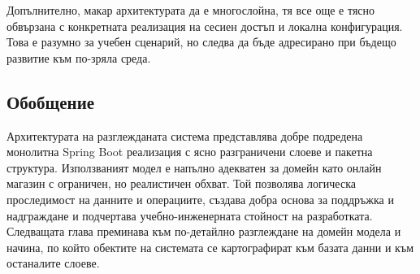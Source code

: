 Допълнително, макар архитектурата да е многослойна, тя все още е тясно обвързана с конкретната реализация на сесиен достъп и локална конфигурация. Това е разумно за учебен сценарий, но следва да бъде адресирано при бъдещо развитие към по-зряла среда.

\subsection{Обобщение}

Архитектурата на разглежданата система представлява добре подредена монолитна Spring Boot реализация с ясно разграничени слоеве и пакетна структура. Използваният модел е напълно адекватен за домейн като онлайн магазин с ограничен, но реалистичен обхват. Той позволява логическа проследимост на данните и операциите, създава добра основа за поддръжка и надграждане и подчертава учебно-инженерната стойност на разработката. Следващата глава преминава към по-детайлно разглеждане на домейн модела и начина, по който обектите на системата се картографират към базата данни и към останалите слоеве.
